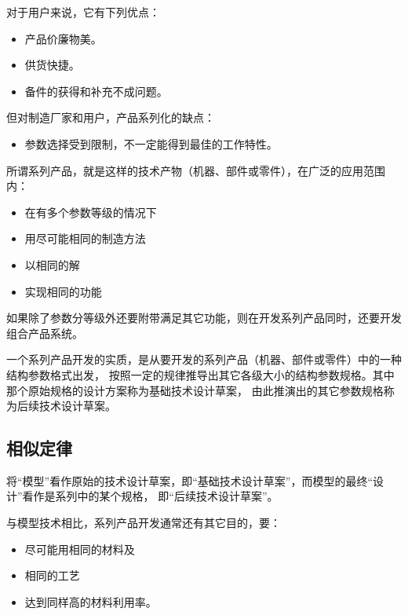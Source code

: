 \documentclass[letterpaper,10pt,english]{sphinxmanual}
\begin{document}
对于用户来说，它有下列优点：
\begin{itemize}
\item {} 
产品价廉物美。

\item {} 
供货快捷。

\item {} 
备件的获得和补充不成问题。

\end{itemize}

但对制造厂家和用户，产品系列化的缺点：
\begin{itemize}
\item {} 
参数选择受到限制，不一定能得到最佳的工作特性。

\end{itemize}

所谓系列产品，就是这样的技术产物（机器、部件或零件），在广泛的应用范围内：
\begin{itemize}
\item {} 
在有多个参数等级的情况下

\item {} 
用尽可能相同的制造方法

\item {} 
以相同的解

\item {} 
实现相同的功能

\end{itemize}

如果除了参数分等级外还要附带满足其它功能，则在开发系列产品同时，还要开发组合产品系统。

一个系列产品开发的实质，是从要开发的系列产品（机器、部件或零件）中的一种结构参数格式出发，
按照一定的规律推导出其它各级大小的结构参数规格。其中那个原始规格的设计方案称为基础技术设计草案，
由此推演出的其它参数规格称为后续技术设计草案。


\subsection{相似定律}
\label{unit7:id3}
将“模型”看作原始的技术设计草案，即“基础技术设计草案”，而模型的最终“设计”看作是系列中的某个规格，
即“后续技术设计草案”。

与模型技术相比，系列产品开发通常还有其它目的，要：
\begin{itemize}
\item {} 
尽可能用相同的材料及

\item {} 
相同的工艺

\item {} 
达到同样高的材料利用率。

\end{itemize}
\end{document}
